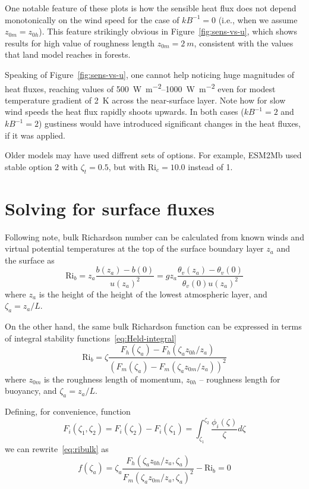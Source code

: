 \documentclass{article}
\newcommand{\zm}{z_{0m}} %
\newcommand{\zh}{z_{0h}} %
\newcommand{\fstab}{\phi} %
\newcommand{\rich}{\text{Ri}} %
\newcommand{\rcrit}{\rich_c} %
\newcommand{\rbulk}{\rich_b} %
\begin{document}
One notable feature of these plots is how the sensible heat flux does not depend monotonically on the wind speed for the case of $k B^{-1}=0$ (i.e., when we assume $\zm=\zh$). This feature strikingly obvious in Figure~\ref{fig:sens-vs-u}, which shows results for high value of roughness length $\zm=\SI{2}{m}$, consistent with the values that land model reaches in forests.

Speaking of Figure~\ref{fig:sens-vs-u}, one cannot help noticing huge magnitudes of heat fluxes, reaching values of \SIrange{500}{1000}{\W\per\m\squared} even for modest temperature gradient of \SI{2}{\K} across the near-surface layer. Note how for slow wind speeds the heat flux rapidly shoots upwards. In both cases ($k B^{-1}=2$ and $k B^{-1}=2$) gustiness would have introduced significant changes in the heat fluxes, if it was applied.

Older models may have used diffrent sets of options. For example, ESM2Mb used stable option 2 with  $\zeta_t=0.5$, but with $\rcrit=10.0$ instead of 1.
\section{Solving for surface fluxes}
Following \cite{Held2004} note, bulk Richardson number can be calculated from known winds and virtual potential temperatures at the top of the surface boundary layer $z_a$ and the surface as
\begin{equation}
    \rbulk = z_a\frac{b(z_a)-b(0)}{u(z_a)^2} = g z_a \frac{\theta_v(z_a)-\theta_v(0)}{\theta_v(0)u(z_a)^2}
\end{equation}
where
$z_a$ is the height of the height of the lowest atmospheric layer, and  $\zeta_a = z_a/L$.

On the other hand, the same bulk Richardson function can be expressed in terms of integral stability functions~\eqref{eq:Held-integral}
\begin{equation}\label{eq:ribulk}
    \rbulk = \zeta \frac{F_h(\zeta_a) - F_h(\zeta_a \zh/z_a)}
        {(F_m(\zeta_a) - F_m(\zeta_a \zm/z_a))^2}
\end{equation}
where
$\zm$ is the roughness length of momentum,
$\zh$ -- roughness length for buoyancy,
and
$\zeta_a = z_a/L$.

Defining, for convenience, function
\begin{equation}
    F_i(\zeta_1, \zeta_2) = F_i(\zeta_2) - F_i(\zeta_1)
                          = \int_{\zeta_1}^{\zeta_2} \frac{\fstab_i(\zeta)}{\zeta} d \zeta
\end{equation}
we can rewrite~\eqref{eq:ribulk} as
\begin{equation}\label{eqzeta}
    f(\zeta_a) = \zeta_a \frac{F_h(\zeta_a \zh/z_a, \zeta_a)}{F_m(\zeta_a \zm/z_a,\zeta_a)^2} - \rbulk = 0
\end{equation}
\end{document}
